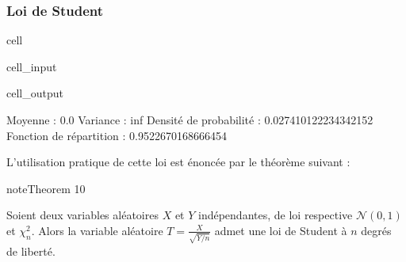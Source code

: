 \documentclass[letterpaper,10pt,english]{jupyterBook}
\begin{document}
\subsubsection{Loi de Student}
\label{\detokenize{elemstats:loi-de-student}}
\begin{sphinxuseclass}{cell}\begin{sphinxVerbatimInput}

\begin{sphinxuseclass}{cell_input}
\begin{sphinxVerbatim}[commandchars=\\\{\}]
   
  
    
  
 
 
 
\end{sphinxVerbatim}

\end{sphinxuseclass}\end{sphinxVerbatimInput}
\begin{sphinxVerbatimOutput}

\begin{sphinxuseclass}{cell_output}
\begin{sphinxVerbatim}[commandchars=\\\{\}]
Moyenne :  0.0
Variance :  inf
Densité de probabilité :  0.027410122234342152
Fonction de répartition :  0.9522670168666454
\end{sphinxVerbatim}

\end{sphinxuseclass}\end{sphinxVerbatimOutput}

\end{sphinxuseclass}
\sphinxAtStartPar
L’utilisation pratique de cette loi est énoncée par le théorème suivant :
\label{elemstats:theorem-16}
\begin{sphinxadmonition}{note}{Theorem 10}



\sphinxAtStartPar
Soient deux variables aléatoires \(X\) et \(Y\) indépendantes, de loi respective \(\mathcal{N}(0,1)\) et \(\chi_n^2\). Alors la variable aléatoire \(T=\frac{X}{\sqrt{Y/n}}\) admet une loi de Student à \(n\) degrés de liberté.
\end{sphinxadmonition}
\end{document}
